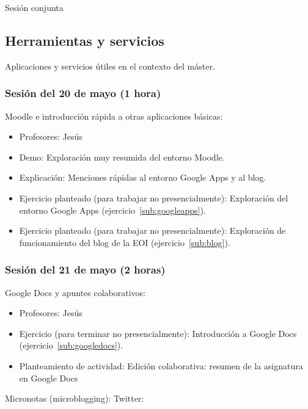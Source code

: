 \documentclass[a4paper,12pt]{article}
\begin{document}
Sesión conjunta

\subsection{Herramientas y servicios}

Aplicaciones y servicios útiles en el contexto del máster.

\subsubsection{Sesión del 20 de mayo (1 hora)}

Moodle e introducción rápida a otras aplicaciones básicas:

\begin{itemize}
\item Profesores: Jesús
\item Demo: Exploración muy resumida del entorno Moodle.
\item Explicación: Menciones rápidas al entorno Google Apps y al blog.
\item Ejercicio planteado (para trabajar no presencialmente): Exploración del entorno Google Apps (ejercicio~\ref{sub:googleapps}).
\item Ejercicio planteado (para trabajar no presencialmente): Exploración de funcionamiento del blog de la EOI (ejercicio~\ref{sub:blog}).
\end{itemize}

\subsubsection{Sesión del 21 de mayo (2 horas)}

Google Docs y apuntes colaborativos:

\begin{itemize}
\item Profesores: Jesús
\item Ejercicio (para terminar no presencialmente): Introducción a Google Docs (ejercicio~\ref{sub:googledocs}).
\item Planteamiento de actividad: Edición colaborativa: resumen de la asignatura en Google Docs
\end{itemize}

Micronotas (microblogging): Twitter:
\end{document}
